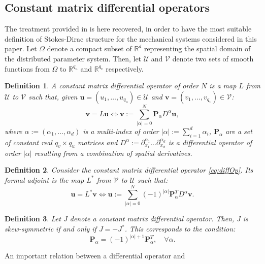 \documentclass[preprint,12pt]{elsarticle}
\newtheorem{definition}{Definition}
\begin{document}
{\subsection{Constant matrix differential operators}
The treatment provided in \cite{MacchelliModelling} is here recovered, in order to have the most suitable definition of Stokes-Dirac structure for the mechanical systems considered in this paper.
Let $\Omega$ denote a compact subset of $\mathbb{R}^d$ representing the spatial domain of the distributed parameter system. Then, let $\mathcal{U}$ and $\mathcal{V}$ denote two sets of smooth functions from $\Omega$ to $\mathbb{R}^{q_u}$ and $\mathbb{R}^{q_v}$ respectively.
\begin{definition}
A constant matrix differential operator of order $N$ is a map $L$ from $\mathcal{U}$ to $\mathcal{V}$ such that, given $\bm{u} = (u_1 , \dots , u_{q_u}) \in \mathcal{U}$ and $\bm{v} = (v_1 , . . . , v_{q_v}) \in \mathcal{V}$:
\begin{equation}
\label{eq:diffOp}
\bm{v} = L \bm{u} \iff \bm{v} := \sum_{|\alpha|=0}^N  \bm{P}_{\alpha} D^{\alpha} \bm{u},
\end{equation}
where $\alpha := (\alpha_1, \dots , \alpha_d)$ is a multi-index of order $|\alpha| := \sum_{i=1}^d \alpha_i$, $\bm{P}_\alpha$ are a set of constant real $q_v \times q_u$ matrices and $D^{\alpha} := \partial_{x_1}^{\alpha_1} \dots \partial_{x_d}^{\alpha_d}$ is a differential operator of order $|\alpha|$ resulting from a combination of spatial derivatives. 
\end{definition}
\begin{definition}
Consider the constant matrix differential operator \eqref{eq:diffOp}. Its formal adjoint is the map $L^*$ from $\mathcal{V}$ to $\mathcal{U}$ such that:
\begin{equation}
\bm{u} = L^* \bm{v} \iff \bm{u} := \sum_{|\alpha|=0}^N  (-1)^{|\alpha|} \bm{P}_{\alpha}^T D^{\alpha} \bm{v}.
\end{equation}
\end{definition}
\begin{definition}
	\label{def:skewOp}
Let $J$ denote a constant matrix differential operator. Then, J is skew-symmetric if and only if $J = -J^*$. This corresponds to the condition:
\begin{equation}
\bm{P}_{\alpha} = (-1)^{|\alpha| + 1} \bm{P}_{\alpha}^T, \quad \forall \alpha.
\end{equation}
\end{definition}
An important relation between a differential operator and
}
\end{document}
